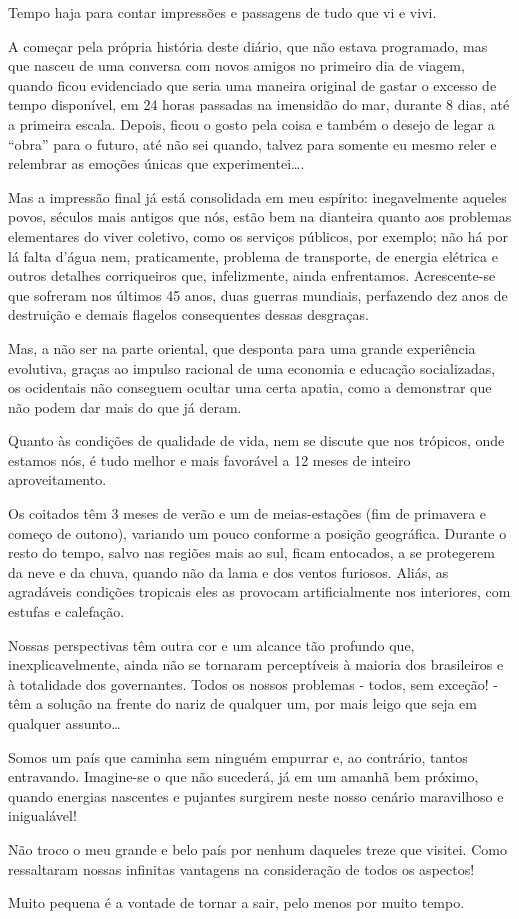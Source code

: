 Tempo haja para contar impressões e passagens de tudo que vi e vivi.

A começar pela própria história deste diário, que não estava programado, mas que nasceu de uma conversa com novos amigos no primeiro dia de viagem, quando ficou evidenciado que seria uma maneira original de gastar o excesso de tempo disponível, em 24 horas passadas na imensidão do mar, durante 8 dias, até a primeira escala. Depois, ficou o gosto pela coisa e também o desejo de legar a “obra” para o futuro, até não sei quando, talvez para somente eu mesmo reler e relembrar as emoções únicas que experimentei\ldots.

Mas a impressão final já está consolidada em meu espírito: inegavelmente aqueles povos, séculos mais antigos que nós, estão bem na dianteira quanto aos problemas elementares do viver coletivo, como os serviços públicos, por exemplo; não há por lá falta d’água nem, praticamente, problema de transporte, de energia elétrica e outros detalhes corriqueiros que, infelizmente, ainda enfrentamos. Acrescente-se que sofreram nos últimos 45 anos, duas guerras mundiais, perfazendo dez anos de destruição e demais flagelos consequentes dessas desgraças.

Mas, a não ser na parte oriental, que desponta para uma grande experiência evolutiva, graças ao impulso racional de uma economia e educação socializadas, os ocidentais não conseguem ocultar uma certa apatia, como a demonstrar que não podem dar mais do que já deram.

Quanto às condições de qualidade de vida, nem se discute que nos trópicos, onde estamos nós, é tudo melhor e mais favorável a 12 meses de inteiro aproveitamento.

Os coitados têm 3 meses de verão e um de meias-estações (fim de primavera e começo de outono), variando um pouco conforme a posição geográfica. Durante o resto do tempo, salvo nas regiões mais ao sul, ficam entocados, a se protegerem da neve e da chuva, quando não da lama e dos ventos furiosos. Aliás, as agradáveis condições tropicais eles as provocam artificialmente nos interiores, com estufas e calefação.

Nossas perspectivas têm outra cor e um alcance tão profundo que, inexplicavelmente, ainda não se tornaram perceptíveis à maioria dos brasileiros e à totalidade dos governantes. Todos os nossos problemas - todos, sem exceção! - têm a solução na frente do nariz de qualquer um, por mais leigo que seja em qualquer assunto\ldots

Somos um país que caminha sem ninguém empurrar e, ao contrário, tantos entravando. Imagine-se o que não sucederá, já em um amanhã bem próximo, quando energias nascentes e pujantes surgirem neste nosso cenário maravilhoso e inigualável!

Não troco o meu grande e belo país por nenhum daqueles treze que visitei. Como ressaltaram nossas infinitas vantagens na consideração de todos os aspectos!

Muito pequena é a vontade de tornar a sair, pelo menos por muito tempo.